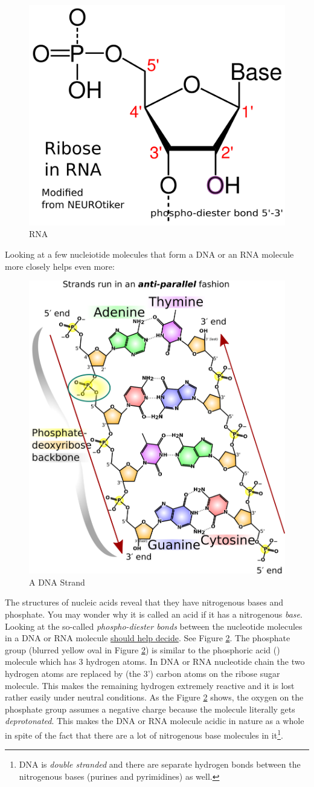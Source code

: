 \documentclass[12pt]{article}
\begin{document}
\begin{figure}[ht!]
    \centering
    \includegraphics[width=0.5\linewidth]{rna-ribose-numbering-std-notation.png}
    \caption{RNA}
    \label{fig: rna}
\end{figure}

Looking at a few nucleiotide molecules that form a DNA or an RNA molecule more closely helps even more:

\begin{figure}[ht!]
    \centering
    \includegraphics[width=0.5\linewidth]{DNA_chemical_structure-madprime.png}
    \caption{A DNA Strand}
    \label{fig: dna-strand}
\end{figure}


The structures of nucleic acids reveal that they have nitrogenous bases and phosphate. You may wonder why it is called an acid if it has a nitrogenous \emph{base}. Looking at the so-called \emph{phospho-diester bonds} between the nucleotide molecules in a DNA or RNA molecule \href{https://biology.stackexchange.com/questions/3864/dna-as-an-acid}{should help decide}. See Figure \ref{fig: dna-strand}. The phosphate group (blurred yellow oval in Figure \ref{fig: dna-strand}) is similar to the phosphoric acid () molecule which has 3 hydrogen atoms. In DNA or RNA nucleotide chain the two hydrogen atoms are replaced by (the 3') carbon atoms on the ribose sugar molecule. This makes the remaining hydrogen extremely reactive and it is lost rather easily under neutral conditions. As the Figure \ref{fig: dna-strand} shows, the oxygen on the phosphate group assumes a negative charge because the molecule literally gets \emph{deprotonated}. This makes the DNA or RNA molecule acidic in nature as a whole in spite of the fact that there are a lot of nitrogenous base molecules in it\footnote{DNA is \emph{double stranded} and there are separate hydrogen bonds between the nitrogenous bases (purines and pyrimidines) as well.}.
\end{document}
